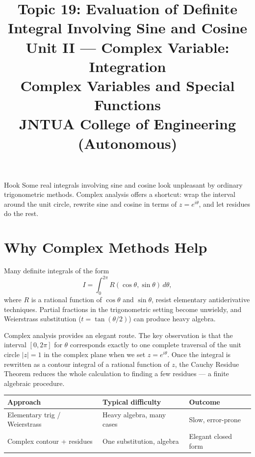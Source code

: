 \documentclass[12pt,a4paper]{article}
\title{\textbf{Topic 19: Evaluation of Definite Integral Involving Sine and Cosine}\\
\large Unit II --- Complex Variable: Integration\\
Complex Variables and Special Functions\\
JNTUA College of Engineering (Autonomous)}
\author{}
\date{}
\begin{document}
\maketitle
\tableofcontents
\newpage

\begin{curiositybox}{Hook}
Some real integrals involving sine and cosine look unpleasant by ordinary
trigonometric methods. Complex analysis offers a shortcut: wrap the interval
around the unit circle, rewrite sine and cosine in terms of $z = e^{i\theta}$,
and let residues do the rest.
\end{curiositybox}

\section{Why Complex Methods Help}

Many definite integrals of the form
\[
  I = \int_0^{2\pi} R(\cos\theta,\sin\theta)\,d\theta,
\]
where $R$ is a rational function of $\cos\theta$ and $\sin\theta$, resist
elementary antiderivative techniques. Partial fractions in the trigonometric
setting become unwieldy, and Weierstrass substitution ($t = \tan(\theta/2)$)
can produce heavy algebra.

Complex analysis provides an elegant route. The key observation is that the
interval $[0, 2\pi]$ for $\theta$ corresponds exactly to one complete traversal
of the unit circle $|z| = 1$ in the complex plane when we set $z = e^{i\theta}$.
Once the integral is rewritten as a contour integral of a rational function of
$z$, the Cauchy Residue Theorem reduces the whole calculation to finding a few
residues --- a finite algebraic procedure.

\begin{center}
\begin{tabular}{@{}lll@{}}
\toprule
\textbf{Approach} & \textbf{Typical difficulty} & \textbf{Outcome} \\
\midrule
Elementary trig / Weierstrass & Heavy algebra, many cases & Slow, error-prone \\
Complex contour + residues     & One substitution, algebra & Elegant closed form \\
\bottomrule
\end{tabular}
\end{center}
\end{document}
